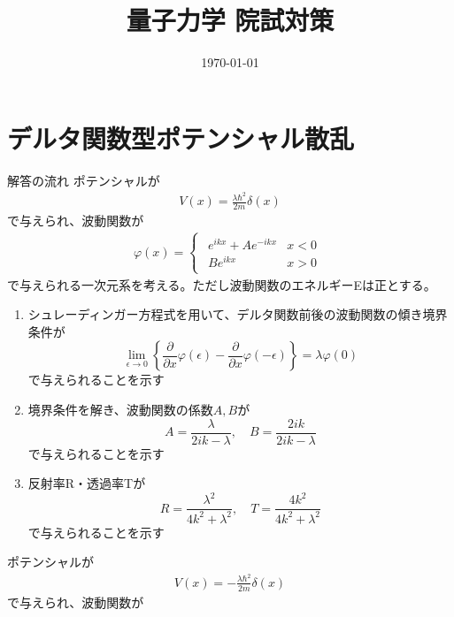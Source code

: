 \documentclass{jsarticle}  %
\title{量子力学 院試対策} %
\author{}%
\date{\today}  %
\numberwithin{equation}{section} %
\numberwithin{figure}{section}
\begin{document}
\maketitle %
\tableofcontents %

\newpage
\section{デルタ関数型ポテンシャル散乱}
    \begin{itembox}[l]{\large{解答の流れ}}
        ポテンシャルが
        \begin{align}
            V(x) = \frac{\lambda\hbar^2}{2m}\delta(x)
        \end{align}
        で与えられ、波動関数が
        \begin{align}
            \varphi (x) = \left\{
            \begin{aligned}
                \begin{matrix}
                    e^{ikx}+Ae^{-ikx}&x<0\\
                    Be^{ikx}&x>0
                \end{matrix}
            \end{aligned}
            \right.
        \end{align}
        で与えられる一次元系を考える。ただし波動関数のエネルギーEは正とする。
        \begin{enumerate}
            \item シュレーディンガー方程式を用いて、デルタ関数前後の波動関数の傾き境界条件が
            \[ \lim_{\epsilon\rightarrow0}\left\{ \frac{\partial}{\partial x}\varphi(\epsilon) -  \frac{\partial}{\partial x}\varphi(-\epsilon)\right\} = \lambda\varphi(0) \]
            で与えられることを示す
            \item 境界条件を解き、波動関数の係数$A,B$が
            \[ A = \frac{\lambda}{2ik - \lambda},\quad B = \frac{2ik}{2ik - \lambda} \]
            で与えられることを示す
            \item 反射率R・透過率Tが
            \[ R = \frac{\lambda^2}{4k^2 + \lambda^2}, \quad T = \frac{4k^2}{4k^2 + \lambda^2} \]
            で与えられることを示す
        \end{enumerate}
        ポテンシャルが
        \begin{align}
            V(x) = -\frac{\lambda\hbar^2}{2m}\delta(x)
        \end{align}
        で与えられ、波動関数が
        \begin{align}

\end{align}
\end{itembox}
\end{document}
